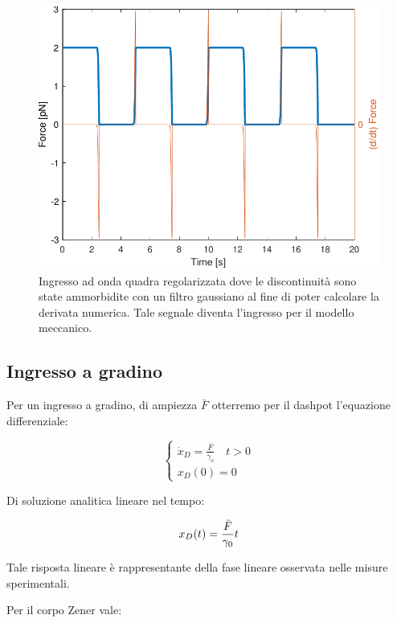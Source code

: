 \begin{figure}[b!]
	\centering
	\includegraphics[width=0.95\linewidth]{../code/figs/square_regularized}
	\caption{Ingresso ad onda quadra regolarizzata dove le discontinuità sono state ammorbidite con un filtro gaussiano al fine di poter calcolare la derivata numerica. Tale segnale diventa l'ingresso per il modello meccanico.}
	\label{fig:squareregularized}
\end{figure}


\subsection{Ingresso a gradino}

Per un ingresso a gradino, di ampiezza $\bar F$ otterremo per il dashpot l'equazione differenziale:

\begin{equation}
	\left\{\begin{array}{l}
		\dot{x}_D=\frac{\bar{F}}{\gamma_{o}} \quad t>0 \\
		x_{D}(0)=0
	\end{array}\right.
\end{equation}

Di soluzione analitica lineare nel tempo:

\begin{equation}
	x_D(t)={\bar F\over \gamma_0}t
\end{equation}

Tale risposta lineare è rappresentante della fase lineare osservata nelle misure sperimentali. 


Per il corpo Zener vale:


